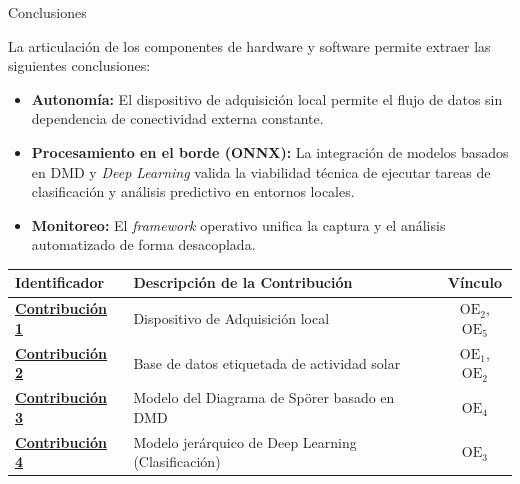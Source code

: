 \documentclass[aspectratio=169]{beamer}
\newcommand{\contrib}[1]{\textcolor{colorRojoContrib}{\textbf{\underline{#1}}}}
\begin{document}
\begin{frame}{Conclusiones}
    \small
    
     La articulación de los componentes de hardware y software permite extraer las siguientes conclusiones:
    
    \begin{itemize}
        \scriptsize
        \item \textbf{Autonomía:} El dispositivo de adquisición local permite el flujo de datos sin dependencia de conectividad externa constante.
        \item \textbf{Procesamiento en el borde (ONNX):} La integración de modelos basados en DMD y \textit{Deep Learning} valida la viabilidad técnica de ejecutar tareas de clasificación y análisis predictivo en entornos locales.
        \item \textbf{Monitoreo:} El \textit{framework} operativo unifica la captura y el análisis automatizado de forma desacoplada.
    \end{itemize}

    \centering
    
    \renewcommand{\arraystretch}{1.2} 
    \begin{table}
        \centering
        \scriptsize
        \begin{tabular}{l|l|c}
            \toprule
            \textbf{Identificador} & \textbf{Descripción de la Contribución} & \textbf{Vínculo} \\ 
            \midrule
            \contrib{Contribución 1} & Dispositivo de Adquisición local & $\text{OE}_2$, $\text{OE}_5$ \\ 
            \contrib{Contribución 2} & Base de datos etiquetada de actividad solar & $\text{OE}_1$, $\text{OE}_2$ \\ 
            \contrib{Contribución 3} & Modelo del Diagrama de Spörer basado en DMD & $\text{OE}_4$ \\ 
            \contrib{Contribución 4} & Modelo jerárquico de Deep Learning (Clasificación) & $\text{OE}_3$ \\ 
            \bottomrule
        \end{tabular}
    \end{table}
\end{frame}


        
\end{document}
